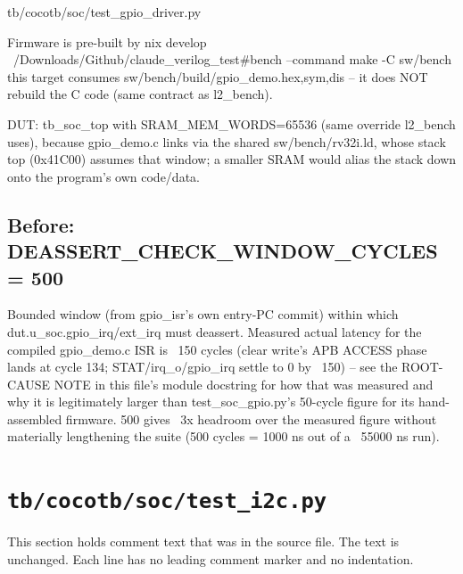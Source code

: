 \begin{relocated}{tb/cocotb/soc/test_gpio_driver.py}
\begin{textblock}
Firmware is pre-built by
nix develop ~/Downloads/Github/claude_verilog_test#bench --command make -C sw/bench
this target consumes sw/bench/build/gpio_demo.{hex,sym,dis} -- it does NOT
rebuild the C code (same contract as l2_bench).

DUT: tb_soc_top with SRAM_MEM_WORDS=65536 (same override l2_bench uses),
because gpio_demo.c links via the shared sw/bench/rv32i.ld, whose stack top
(0x41C00) assumes that window; a smaller SRAM would alias the stack down
onto the program's own code/data.
\end{textblock}

\subsection*{Before: DEASSERT\_CHECK\_WINDOW\_CYCLES = 500}

\begin{textblock}
Bounded window (from gpio_isr's own entry-PC commit) within which
dut.u_soc.gpio_irq/ext_irq must deassert. Measured actual latency for the
compiled gpio_demo.c ISR is ~150 cycles (clear write's APB ACCESS phase
lands at cycle 134; STAT/irq_o/gpio_irq settle to 0 by ~150) -- see the
ROOT-CAUSE NOTE in this file's module docstring for how that was measured
and why it is legitimately larger than test_soc_gpio.py's 50-cycle figure
for its hand-assembled firmware. 500 gives ~3x headroom over the measured
figure without materially lengthening the suite (500 cycles = 1000 ns out
of a ~55000 ns run).
\end{textblock}

\end{relocated}

\section{\texttt{tb/cocotb/soc/test\_i2c.py}}\label{tm:suite:soc-test-i2c}

This section holds comment text that was in the source file. The text is unchanged. Each line has no leading comment marker and no indentation.

